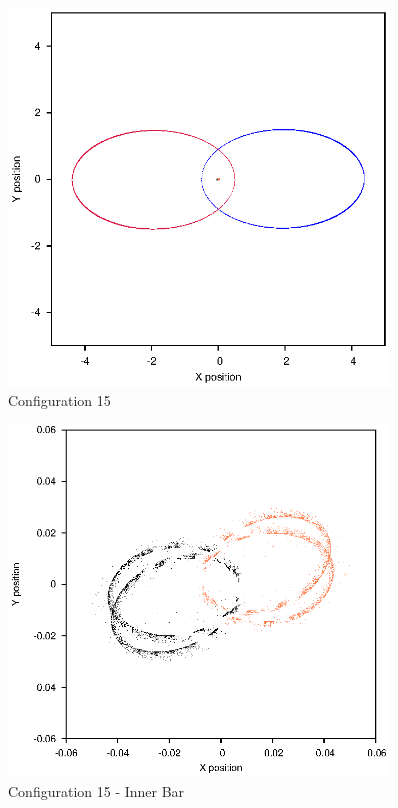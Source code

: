 \documentclass[a4paper,12pt]{article}
\begin{document}
\begin{figure}[H]
\centering
\includegraphics[width=0.9\textwidth]{./results/05-9-05-15/Orbit.eps}
\caption{Configuration 15}
\label{fig:config15}
\end{figure}
\begin{figure}[H]
\centering
\includegraphics[width=0.9\textwidth]{./results/05-9-05-15/Inner.eps}
\caption{Configuration 15 - Inner Bar}
\label{fig:config15i}
\end{figure}
\end{document}
